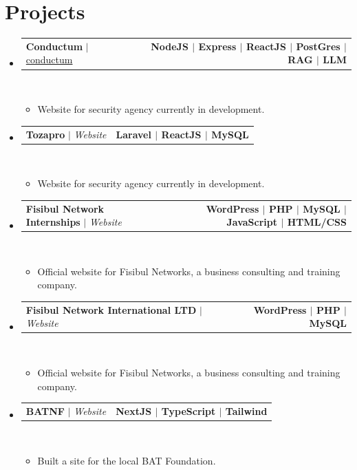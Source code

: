 \documentclass[letterpaper,11pt]{article}
\makeatletter
\newcommand{\resumeItem}[1]{
  \item\small{
    {#1 \vspace{0pt}}
  }
}
\newcommand{\resumeProjectHeading}[2]{
    \item
    \begin{tabular*}{1.001\textwidth}{l@{\extracolsep{\fill}}r}
      \small#1 & \textbf{\small #2}\\
    \end{tabular*}\vspace{-7pt}
}
\newcommand{\resumeSubHeadingListStart}{\begin{itemize}[leftmargin=0.0in, label={}]}
\newcommand{\resumeSubHeadingListEnd}{\end{itemize}}\vspace{0pt}
\newcommand{\resumeItemListStart}{\begin{itemize}}
\newcommand{\resumeItemListEnd}{\end{itemize}\vspace{-5pt}}
\makeatother
\begin{document}
\section{Projects}
    \vspace{-5pt}
    \resumeSubHeadingListStart
        \resumeProjectHeading
            {\textbf{Conductum} $|$ \href{https://www.linkedin.com/in/damilola-nwankpele-b32963122/}{conductum}}{NodeJS $|$ Express $|$ ReactJS $|$ PostGres $|$ RAG $|$ LLM}
            ~\\[5mm]
            \resumeItemListStart
                \resumeItem{Website for security agency currently in development.}
            \resumeItemListEnd
        \vspace{-20pt}
        \resumeProjectHeading
            {\textbf{Tozapro} $|$ \emph{Website}}{Laravel $|$ ReactJS $|$ MySQL}
            ~\\[5mm]
            \resumeItemListStart
                \resumeItem{Website for security agency currently in development.}
            \resumeItemListEnd
        \vspace{-20pt}
        \resumeProjectHeading
            {\textbf{Fisibul Network Internships} $|$ \emph{Website}}{WordPress $|$ PHP $|$ MySQL $|$ JavaScript $|$ HTML/CSS}
            ~\\[5mm]
            \resumeItemListStart
                \resumeItem{Official website for Fisibul Networks, a business consulting and training company.}
            \resumeItemListEnd
        \vspace{-20pt}
        \resumeProjectHeading
            {\textbf{Fisibul Network International LTD} $|$ \emph{Website}}{WordPress $|$ PHP $|$ MySQL}
            ~\\[5mm]
            \resumeItemListStart
                \resumeItem{Official website for Fisibul Networks, a business consulting and training company.}
            \resumeItemListEnd
        \vspace{-20pt}
        \resumeProjectHeading
            {\textbf{BATNF} $|$ \emph{Website}}{NextJS $|$ TypeScript $|$ Tailwind}
            ~\\[5mm]
            \resumeItemListStart
                \resumeItem{Built a site for the local BAT Foundation.}
            \resumeItemListEnd
    \resumeSubHeadingListEnd
    \vspace{-28pt}

\end{document}
